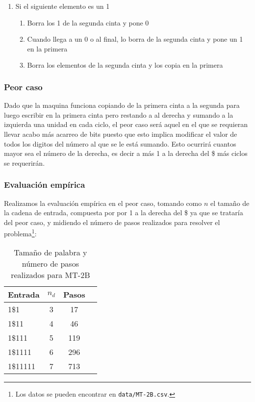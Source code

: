\begin{itemize}
\begin{enumerate}
\begin{enumerate}
        \end{enumerate}
        \item Si el siguiente elemento es un 1
        \begin{enumerate}
            \item Borra los 1 de la segunda cinta y pone 0
            \item Cuando llega a un 0 o al final, lo borra de la segunda cinta y pone un 1 en la primera
            \item Borra los elementos de la segunda cinta y los copia en la primera
        \end{enumerate}
    \end{enumerate}
\end{itemize}



\subsubsection*{Peor caso}
Dado que la maquina funciona copiando de la primera cinta a la segunda para luego escribir en la primera cinta pero restando a al derecha y sumando a la izquierda una unidad en cada ciclo, el peor caso será aquel en el que se requieran llevar acabo más acarreo de bits puesto que esto implica modificar el valor de todos los digitos del número al que se le está sumando. Esto ocurrirá cuantos mayor sea el número de la derecha, es decir a más 1 a la derecha del \$ más ciclos se requerirán.\medskip

\subsubsection*{Evaluación empírica}
Realizamos la evaluación empírica en el peor caso, tomando como $n$ el tamaño de la cadena de entrada, compuesta por por 1 a la derecha del \$ ya que se trataría del peor caso, y midiendo el número de pasos realizados para resolver el problema\footnote{Los datos se pueden encontrar en \texttt{data/MT-2B.csv}.}:

\begin{table}[h]
    \centering
    \begin{tabular}{lccc}
        Entrada & $n_d$ & Pasos \\
        \hline
        1\$1                     & 3  & 17   \\
        1\$11                    & 4  & 46   \\
        1\$111                   & 5  & 119   \\
        1\$1111                  & 6  & 296  \\
        1\$11111                 & 7  & 713  \\
    \end{tabular}
    \caption{Tamaño de palabra y número de pasos realizados para MT-2B}
\end{table}

